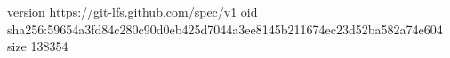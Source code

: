 version https://git-lfs.github.com/spec/v1
oid sha256:59654a3fd84c280c90d0eb425d7044a3ee8145b211674ec23d52ba582a74e604
size 138354
